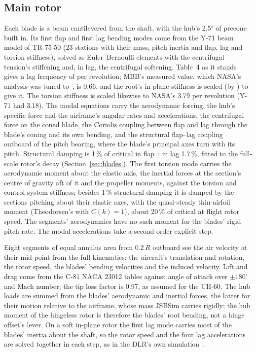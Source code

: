 \documentclass[10pt,a4paper,twocolumn]{article}
\begin{document}
\subsection{Main rotor}
Each blade is a beam cantilevered from the shaft, with the hub's 2.5$^\circ$ of precone built in. Its first flap and first lag bending
modes come from the Y-71 beam model of TR-75-50 (23 stations with their mass, pitch inertia and flap, lag and torsion stiffness), solved as
Euler--Bernoulli elements with the centrifugal tension's stiffening and, in lag, the centrifugal softening. Table~4 as it stands gives a lag
frequency of \NBlagBeam{} per revolution; MBB's measured value, which NASA's analysis was tuned to~\cite{pt}, is 0.66, and the root's in-plane
stiffness is scaled (by \NBlagScale) to give it. The torsion stiffness is scaled likewise to NASA's 3.79 per revolution (Y-71 had 3.18). The
modal equations carry the aerodynamic forcing, the hub's specific force and the airframe's angular rates and accelerations, the centrifugal
force on the coned blade, the Coriolis coupling between flap and lag through the blade's coning and its own bending, and the structural
flap--lag coupling outboard of the pitch bearing, where the blade's principal axes turn with its pitch. Structural damping is 1\,\% of critical
in flap~\cite{tr}; in lag 1.7\,\%, fitted to the full-scale rotor's decay (Section~\ref{sec:blades}). The first torsion mode carries the
aerodynamic moment about the elastic axis, the inertial forces at the section's centre of gravity aft of it and the propeller moments,
against the torsion and control system stiffness; besides 1\,\% structural damping it is damped by the sections pitching about their
elastic axes, with the quasi-steady thin-airfoil moment (Theodorsen's with $C(k)=1$), about 20\,\% of critical at flight rotor speed. The
segments' aerodynamics have no such moment for the blades' rigid pitch rate. The modal accelerations take a second-order explicit step.

Eight segments of equal annulus area from 0.2\,$R$ outboard see the air velocity at their mid-point from the full kinematics: the
aircraft's translation and rotation, the rotor speed, the blades' bending velocities and the induced velocity. Lift and drag come from the
C-81 NACA 23012 tables against angle of attack over $\pm180^\circ$ and Mach number; the tip loss factor is 0.97, as assumed for the UH-60.
The hub loads are summed from the blades' aerodynamic and inertial forces, the latter for their motion relative to the airframe, whose
mass JSBSim carries rigidly; the hub moment of the hingeless rotor is therefore the blades' root bending, not a hinge offset's lever.
On a soft in-plane rotor the first lag mode carries most of the blades' inertia about the shaft, so the rotor speed and the four lag
accelerations are solved together in each step, as in the DLR's own simulation~\cite{hg}.
\end{document}
